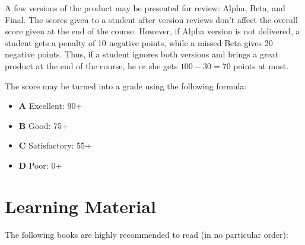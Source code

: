 \documentclass[nobrand,anonymous,nodate,nosecurity]{huawei}
\begin{document}
A few versions of the product may be presented for review:
Alpha, Beta, and Final. The scores given to a student
after version reviews don't affect the overall
score given at the end of the course. However, if Alpha
version is not delivered, a student gets a penalty of 10 negative points,
while a missed Beta gives 20 negative points. Thus, if a student
ignores both versions and brings a great product at the end of the course,
he or she gets $100-30=70$ points at most.

The score may be turned into a grade using the following formula:

\begin{itemize}
\item \textbf{A} Excellent: 90+
\item \textbf{B} Good: 75+
\item \textbf{C} Satisfactory: 55+
\item \textbf{D} Poor: 0+
\end{itemize}

\newpage
\section*{Learning Material}

The following books are highly recommended to read (in no particular order):
\end{document}

